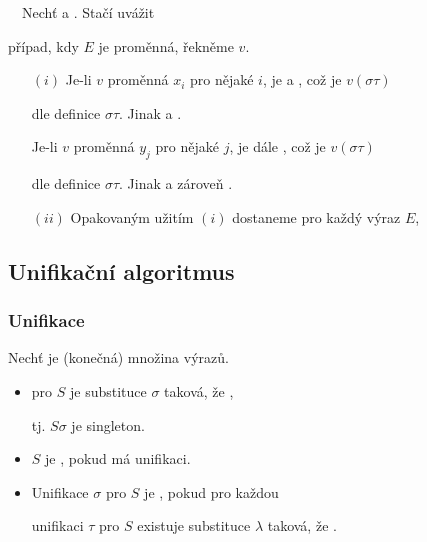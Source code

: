     {\it {}}\ \ Nechť  a . Stačí uvážit
    \smallskip
    
    případ, kdy $E$ je proměnná, řekněme $v$.
    \smallskip
    
    \begin{enumerate}
    \item[$(i)$] Je-li $v$ proměnná $x_i$ pro nějaké $i$, je  a , což je $v(\sigma\tau)$
    \smallskip
    
    dle definice $\sigma\tau$. Jinak  a .
    \smallskip
    
    \item[] Je-li $v$ proměnná $y_j$ pro nějaké $j$, je dále , což je $v(\sigma\tau)$
    \smallskip
    
    dle definice $\sigma\tau$. Jinak  a zároveň .
    \smallskip
    
    \item[$(ii)$] Opakovaným užitím $(i)$ dostaneme pro každý výraz $E$,
    \vspace{-2mm}
    
    \vspace{-6mm}
    \end{enumerate}
    

\subsection{Unifikační algoritmus}\todo

\subsubsection*{Unifikace}
    Nechť  je (konečná) množina výrazů.
    \smallskip
    
    \begin{itemize}
    \item {} pro $S$ je substituce $\sigma$ taková, že ,
    \smallskip
    
    tj. $S\sigma$ je singleton.
    \smallskip
    
    \item $S$ je , pokud má unifikaci.
    \smallskip
    
    \item Unifikace $\sigma$ pro $S$ je , pokud pro každou
    \smallskip
    
    unifikaci $\tau$ pro $S$ existuje substituce $\lambda$ taková, že \mygreen{$\tau=\sigma\lambda$}.
    \end{itemize}
    \medskip
    
